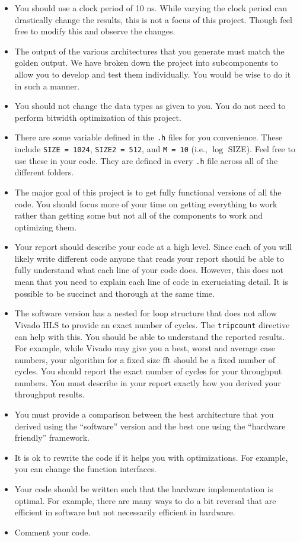 \begin{itemize}
\item You should use a clock period of 10 ns. While varying the clock period can drastically change the results, this is not a focus of this project. Though feel free to modify this and observe the changes. 
\item The output of the various architectures that you generate must match the golden output. We have broken down the project into subcomponents to allow you to develop and test them individually. You would be wise to do it in such a manner.
\item You should not change the data types as given to you. You do not need to perform bitwidth optimization of this project.
\item There are some variable defined in the \texttt{.h} files for you convenience. These include \texttt{SIZE = 1024}, \texttt{SIZE2 = 512}, and \texttt{M = 10} (i.e., $\log$ SIZE). Feel free to use these in your code. They are defined in every \texttt{.h} file across all of the different folders.
\item The major goal of this project is to get fully functional versions of all the code. You should focus more of your time on getting everything to work rather than getting some but not all of the components to work and optimizing them.
\item Your report should describe your code at a high level. Since each of you will likely write different code anyone that reads your report should be able to fully understand what each line of your code does. However, this does not mean that you need to explain each line of code in excruciating detail. It is possible to be succinct and thorough at the same time.
\item The software version has a nested for loop structure that does not allow Vivado HLS to provide an exact number of cycles. The \texttt{tripcount} directive can help with this. You should be able to understand the reported results. For example, while Vivado may give you a best, worst and average case numbers, your algorithm for a fixed size \gls{fft} should be a fixed number of cycles. You should report the exact number of cycles for your throughput numbers. You must describe in your report exactly how you derived your throughput results.
\item You must provide a comparison between the best architecture that you derived using the ``software'' version and the best one using the ``hardware friendly'' framework.
\item It is ok to rewrite the code if it helps you with optimizations. For example, you can change the function interfaces.
\item Your code should be written such that the hardware implementation is optimal. For example, there are many ways to do a bit reversal that are efficient in software but not necessarily efficient in hardware.
\item Comment your code.
\end{itemize}

